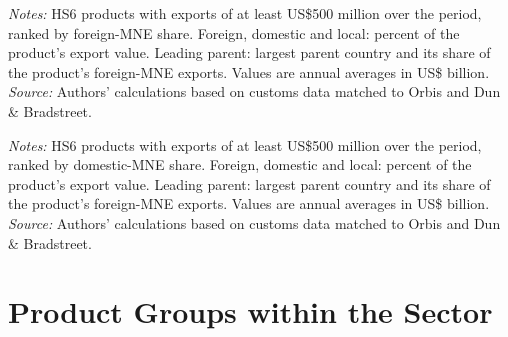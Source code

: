 \documentclass[11pt,a4paper]{article}
\begin{document}
\begin{table}[H]\centering\footnotesize%
  \caption{Mining and Fuels: Products with the Highest Foreign-Multinational Share}%
  \label{tab:hs_by_foreign_share_mining}%
  \par\vspace{3pt}%
  \begin{minipage}{0.95\textwidth}\footnotesize %
  \textit{Notes:} HS6 products with exports of at least US\$500 million over the period, ranked by foreign-MNE share. Foreign, domestic and local: percent of the product's export value. Leading parent: largest parent country and its share of the product's foreign-MNE exports. Values are annual averages in US\$ billion.\\[3pt]%
  \textit{Source:} Authors' calculations based on customs data matched to Orbis and Dun \& Bradstreet.%
  \end{minipage}%
  \end{table}
\begin{table}[H]\centering\footnotesize%
  \caption{Mining and Fuels: Products with the Highest Domestic-Multinational Share}%
  \label{tab:hs_by_domestic_share_mining}%
  \par\vspace{3pt}%
  \begin{minipage}{0.95\textwidth}\footnotesize %
  \textit{Notes:} HS6 products with exports of at least US\$500 million over the period, ranked by domestic-MNE share. Foreign, domestic and local: percent of the product's export value. Leading parent: largest parent country and its share of the product's foreign-MNE exports. Values are annual averages in US\$ billion.\\[3pt]%
  \textit{Source:} Authors' calculations based on customs data matched to Orbis and Dun \& Bradstreet.%
  \end{minipage}%
  \end{table}

\section{Product Groups within the Sector}\label{sec:sub_mining}
\end{document}
